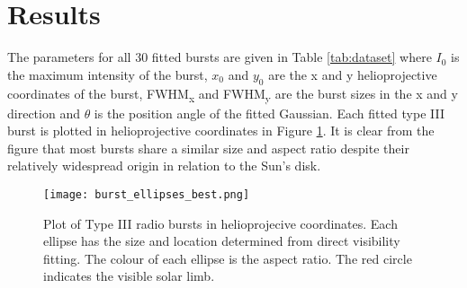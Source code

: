 


\section{Results}
\label{sec:obsvtheory_results}
The parameters for all 30 fitted bursts are given in Table \ref{tab:dataset} where $I_0$ is the maximum intensity of the burst, $x_0$ and $y_0$ are the x and y  helioprojective coordinates of the burst, FWHM\textsubscript{x} and FWHM\textsubscript{y} are the burst sizes in the x and y direction and $\theta$ is the position angle of the fitted Gaussian. Each fitted type III burst is plotted in helioprojective coordinates in Figure \ref{fig:burst_overlay}. It is clear from the figure that most bursts share a similar size and aspect ratio despite their relatively widespread origin in relation to the Sun's disk.

\begin{figure}[ht]
\centering
\texttt{[image: burst\_ellipses\_best.png]}
\caption[Plot of Type III radio bursts in helioprojecive coordinates.]{Plot of Type III radio bursts in helioprojecive coordinates. Each ellipse has the size and location determined from direct visibility fitting. The colour of each ellipse is the aspect ratio. The red circle indicates the visible solar limb. }
\label{fig:burst_overlay}
\end{figure}

